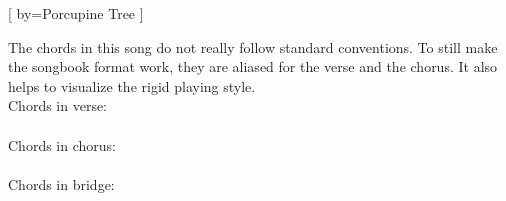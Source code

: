 [
  by={Porcupine Tree}
]

\begin{infotext}
  The chords in this song do not really follow standard conventions.
  To still make the songbook format work, they are aliased for the verse and the chorus.
  It also helps to visualize the rigid playing style.\\[1em]
  Chords in verse:\\
  \\[1em]
  Chords in chorus:\\
  \\[1em]
  Chords in bridge:\\
\end{infotext}


